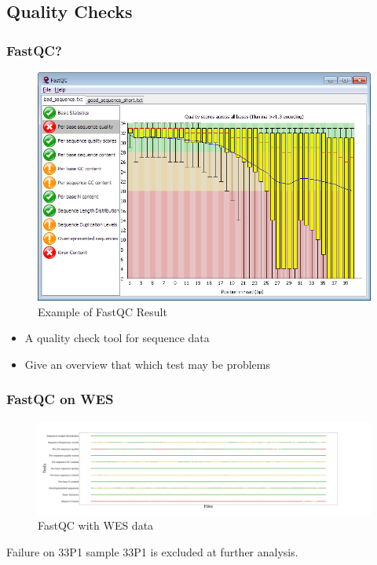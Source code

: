 \documentclass{beamer}
\begin{document}
    \subsection{Quality Checks}
    \begin{frame}
        \frametitle{FastQC?}

        \begin{figure}
            \includegraphics[width=0.5 \linewidth]{figures/Workflow/FastQC.png}
            \caption{Example of FastQC Result \protect\cite{fastqc1}}
        \end{figure}

        \begin{itemize}
            \item A quality check tool for sequence data
            \item Give an overview that which test may be problems
        \end{itemize}
    \end{frame}

    \begin{frame}
        \frametitle{FastQC on WES}

        \begin{figure}
            \includegraphics[width=\linewidth]{figures/FastQC/FastQC_WES.pdf}
            \caption{FastQC with WES data}
        \end{figure}

        \begin{alertblock}{Failure on 33P1 sample}
            33P1 is excluded at further analysis.
        \end{alertblock}
    \end{frame}
\end{document}
